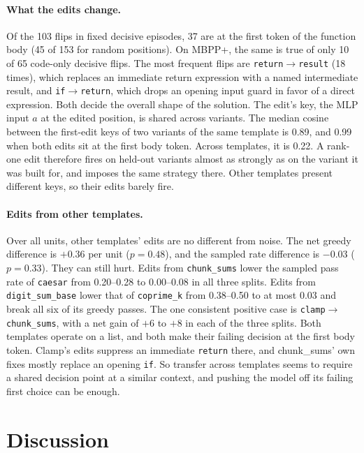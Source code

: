 \documentclass[11pt]{article}
\begin{document}
\paragraph{What the edits change.}
Of the 103 flips in fixed decisive episodes, 37 are at the first token of the function body (45 of 153 for random positions). On MBPP+, the same is true of only 10 of 65 code-only decisive flips. The most frequent flips are \texttt{return}$\to$\texttt{result} (18 times), which replaces an immediate return expression with a named intermediate result, and \texttt{if}$\to$\texttt{return}, which drops an opening input guard in favor of a direct expression. Both decide the overall shape of the solution. The edit's key, the MLP input $a$ at the edited position, is shared across variants. The median cosine between the first-edit keys of two variants of the same template is 0.89, and 0.99 when both edits sit at the first body token. Across templates, it is 0.22. A rank-one edit therefore fires on held-out variants almost as strongly as on the variant it was built for, and imposes the same strategy there. Other templates present different keys, so their edits barely fire.

\paragraph{Edits from other templates.}
Over all units, other templates' edits are no different from noise. The net greedy difference is $+0.36$ per unit ($p{=}0.48$), and the sampled rate difference is $-0.03$ ($p{=}0.33$). They can still hurt. Edits from \texttt{chunk\_sums} lower the sampled pass rate of \texttt{caesar} from 0.20--0.28 to 0.00--0.08 in all three splits. Edits from \texttt{digit\_sum\_base} lower that of \texttt{coprime\_k} from 0.38--0.50 to at most 0.03 and break all six of its greedy passes. The one consistent positive case is \texttt{clamp}$\to$\texttt{chunk\_sums}, with a net gain of $+6$ to $+8$ in each of the three splits. Both templates operate on a list, and both make their failing decision at the first body token. Clamp's edits suppress an immediate \texttt{return} there, and chunk\_sums' own fixes mostly replace an opening \texttt{if}. So transfer across templates seems to require a shared decision point at a similar context, and pushing the model off its failing first choice can be enough.

\section{Discussion}
\end{document}
